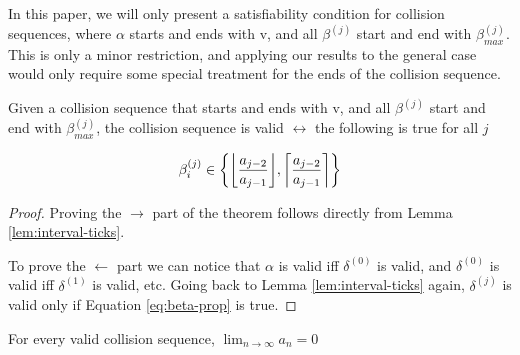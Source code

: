 
In this paper, we will only present a satisfiability condition for collision sequences, where $\alpha$ starts and ends with v, and all $\beta^{(j)}$ start and end with $\beta^{(j)}_{max}$. This is only a minor restriction, and applying our results to the general case would only require some special treatment for the ends of the collision sequence.


\begin{theorem}\label{thm:beta_i}
	Given a collision sequence that starts and ends with v, and all $\beta^{(j)}$ start and end with $\beta^{(j)}_{max}$, the collision sequence is valid $\leftrightarrow$ the following is true for all $j$

	\begin{equation}\label{eq:beta-prop}
		\beta^{(j)}_i \in \cbracket{\floor{\frac{a_{j-2}}{a_{j-1}}}, \ceil{\frac{a_{j-2}}{a_{j-1}}}}
	\end{equation}
\end{theorem}

\begin{proof}
	Proving the $\rightarrow$ part of the theorem follows directly from Lemma \ref{lem:interval-ticks}.

	To prove the $\leftarrow$ part we can notice that $\alpha$ is valid iff $\delta^{(0)}$ is valid, and $\delta^{(0)}$ is valid iff $\delta^{(1)}$ is valid, etc. Going back to Lemma \ref{lem:interval-ticks} again, $\delta^{(j)}$ is valid only if Equation \ref{eq:beta-prop} is true.
\end{proof}


\begin{theorem}
	For every valid collision sequence, ${\displaystyle \lim_{n \to \infty} a_n = 0}$
\end{theorem}

